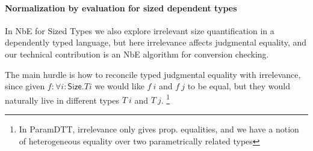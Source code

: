 \documentclass{book}
\begin{document}
\paragraph{Normalization by evaluation for sized dependent types}
    In NbE for Sized Types we also explore irrelevant size
    quantification in a dependently typed language, but here
    irrelevance affects judgmental equality, and our technical
    contribution is an NbE algorithm for conversion checking.

    The main hurdle is how to reconcile typed judgmental equality with
    irrelevance, since given $f : \forall i : \mathsf{Size}. T i$ we would like
    $f~i$ and $f~j$ to be equal, but they would naturally live in
    different types $T~i$ and $T~j$.
    \footnote{In ParamDTT, irrelevance only gives prop. equalities,
      and we have a notion of heterogeneous equality over two
      parametrically related types}
\end{document}
